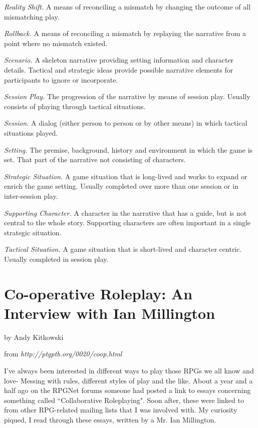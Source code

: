 \documentclass[twoside]{book}
\begin{document}
\begin{description}
\item{\it Reality Shift.} A means of reconciling a mismatch by changing the
outcome of all mismatching play.

\item{\it Rollback.} A means of reconciling a mismatch by replaying the narrative
from a point where no mismatch existed.

\item{\it Scenario.} A skeleton narrative providing setting information and
character details. Tactical and strategic ideas provide possible
narrative elements for participants to ignore or incorporate.

\item{\it Session Play.} The progression of the narrative by means of session
play. Usually consists of playing through tactical situations.

\item{\it Session.} A dialog (either person to person or by other means) in which
tactical situations played.

\item{\it Setting.} The premise, background, history and environment in which the
game is set. That part of the narrative not consisting of characters.

\item{\it Strategic Situation.} A game situation that is long-lived and works to
expand or enrich the game setting. Usually completed over more than
one session or in inter-session play.

\item{\it Supporting Character.} A character in the narrative that has a guide,
but is not central to the whole story. Supporting characters are often
important in a single strategic situation.

\item{\it Tactical Situation.} A game situation that is short-lived and character
centric. Usually completed in session play.
\end{description}

\chapter{Co-operative Roleplay: An Interview with Ian Millington}
by Andy Kitkowski

from {\it http://ptgptb.org/0020/coop.html}

I've always been interested in different ways to play those RPGs we all know and love- Messing with rules, different styles of play and the like. About a year and a half ago on the RPGNet forums someone had posted a link to essays concerning something called ``Collaborative Roleplaying". Soon after, these were linked to from other RPG-related mailing lists that I was involved with. My curiosity piqued, I read through these essays, written by a Mr. Ian Millington.
\end{document}
